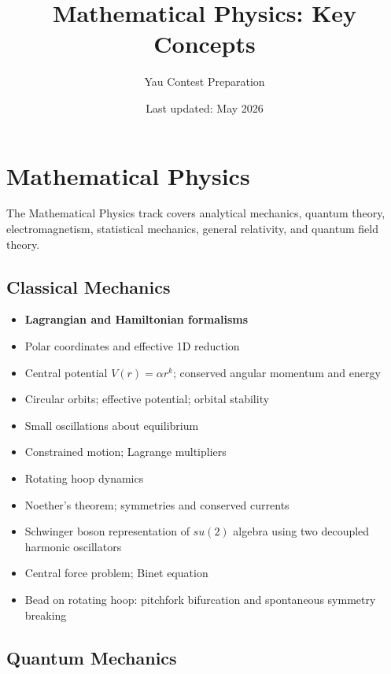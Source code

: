 \documentclass{amsart}
\title{Mathematical Physics: Key Concepts}
\author{Yau Contest Preparation}
\date{Last updated: May 2026}
\begin{document}
\maketitle

\section{Mathematical Physics}
\label{sec:physics_concepts}

The Mathematical Physics track covers analytical mechanics, quantum theory, electromagnetism, statistical mechanics, general relativity, and quantum field theory.

\subsection{Classical Mechanics}

\begin{itemize}
  \item \textbf{Lagrangian and Hamiltonian formalisms}
  \item Polar coordinates and effective 1D reduction
  \item Central potential $V(r)=\alpha r^k$; conserved angular momentum and energy
  \item Circular orbits; effective potential; orbital stability
  \item Small oscillations about equilibrium
  \item Constrained motion; Lagrange multipliers
  \item Rotating hoop dynamics
  \item Noether's theorem; symmetries and conserved currents
  \item Schwinger boson representation of $su(2)$ algebra using two decoupled harmonic oscillators
  \item Central force problem; Binet equation
  \item Bead on rotating hoop: pitchfork bifurcation and spontaneous symmetry breaking
\end{itemize}

\subsection{Quantum Mechanics}
\end{document}

